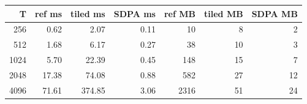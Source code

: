 \begin{tabular}{rrrrrrr}\toprule T & ref ms & tiled ms & SDPA ms & ref MB & tiled MB & SDPA MB\\\midrule
256 & 0.62 & 2.07 & 0.11 & 10 & 8 & 2\\
512 & 1.68 & 6.17 & 0.27 & 38 & 10 & 3\\
1024 & 5.70 & 22.39 & 0.45 & 148 & 15 & 7\\
2048 & 17.38 & 74.08 & 0.88 & 582 & 27 & 12\\
4096 & 71.61 & 374.85 & 3.06 & 2316 & 51 & 24\\
\bottomrule\end{tabular}